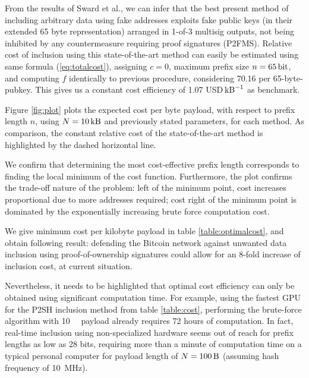 \documentclass[a4paper,11pt,titlepage]{scrbook}
\begin{document}
From the results of Sward et al., we can infer that the best present method of including arbitrary data using fake addresses exploits fake public keys (in their extended 65 byte representation) arranged in 1-of-3 multisig outputs, not being inhibited by any countermeasure requiring proof signatures (P2FMS). \cite[cf.~also table 3]{sward_data_2018}
Relative cost of inclusion using this state-of-the-art method can easily be estimated using same formula (\ref{eq:totalcost}), assigning $c=0$, maximum prefix size $n=\SI{65}{\bit}$, and computing $f$ identically to previous procedure, considering \SI{70.16}{\byte} per 65-byte-pubkey.
This gives us a constant cost efficiency of \num{1.07} USD$\,\si{\per\kilo\byte}$ as benchmark.

Figure \ref{fig:plot} plots the expected cost per byte payload, with respect to prefix length $n$, using $N=\SI{10}{\kilo\byte}$ and previously stated parameters, for each method.
As comparison, the constant relative cost of the state-of-the-art method is highlighted by the dashed horizontal line. 

We confirm that determining the most cost-effective prefix length corresponds to finding the local minimum of the cost function.
Furthermore, the plot confirms the trade-off nature of the problem: left of the minimum point, cost increases proportional due to more addresses required; cost right of the minimum point is dominated by the exponentially increasing brute force computation cost.

We give minimum cost per kilobyte payload in table \ref{table:optimalcost},
and obtain following result: 
defending the Bitcoin network against unwanted data inclusion using proof-of-ownership signatures could allow for an 8-fold increase of inclusion cost, at current situation.

Nevertheless, it needs to be highlighted that optimal cost efficiency can only be obtained using significant computation time.
For example, using the fastest GPU for the P2SH inclusion method from table \ref{table:cost}, performing the brute-force algorithm with \SI{10}{\kilo\byte} payload already requires 72 hours of computation.
In fact, real-time inclusion using non-specialized hardware seems out of reach for prefix lengths as low as 28 bits, requiring more than a minute of computation time on a typical personal computer for payload length of $N=\SI{100}{\byte}$ (assuming hash frequency of \SI{10}{\mega\hertz}).
\end{document}
